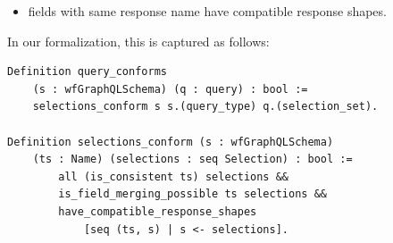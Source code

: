 \begin{definition}
\begin{itemize}
    \item fields with same response name have compatible response shapes.
\end{itemize}
\end{definition}


In our formalization, this is captured as follows:


\begin{verbatim}
Definition query_conforms 
    (s : wfGraphQLSchema) (q : query) : bool :=
    selections_conform s s.(query_type) q.(selection_set).
    
Definition selections_conform (s : wfGraphQLSchema)
    (ts : Name) (selections : seq Selection) : bool :=
        all (is_consistent ts) selections &&
        is_field_merging_possible ts selections &&
        have_compatible_response_shapes
            [seq (ts, s) | s <- selections].

\end{verbatim}

